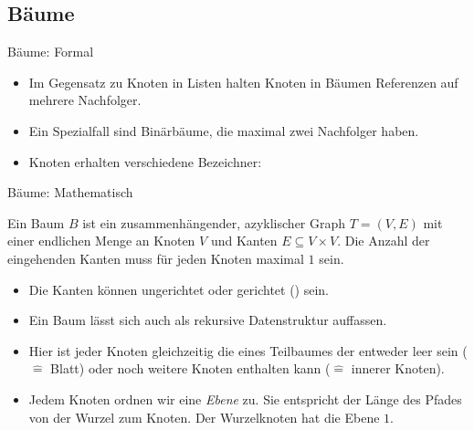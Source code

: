 \subsection{Bäume}
\begin{frame}{Bäume: Formal}
    \begin{itemize}[<+(1)->]
        \widei
        \item Im Gegensatz zu Knoten in Listen halten Knoten in Bäumen Referenzen auf mehrere Nachfolger.
        \item Ein Spezialfall sind Binärbäume, die maximal zwei Nachfolger haben.
        \item Knoten erhalten verschiedene Bezeichner: 
    \end{itemize}
\end{frame}

\begin{frame}{Bäume: Mathematisch}
    \begin{definition}[Baum]
Ein Baum \(B\) ist ein zusammenhängender, azyklischer Graph \(T = (V,E)\) mit einer endlichen Menge an Knoten \(V\) und Kanten \(E \subseteq V \times V\).\pause{} Die Anzahl der eingehenden Kanten muss für jeden Knoten maximal \(1\) sein.
    \end{definition}
    \begin{itemize}[<+(1)->]
        \item Die Kanten können ungerichtet oder gerichtet () sein.
        \item Ein Baum lässt sich auch als rekursive Datenstruktur auffassen.
        \item Hier ist jeder Knoten gleichzeitig die  eines Teilbaumes\pause{} der entweder leer sein (\(\widehat{=}\) Blatt)\pause{} oder noch weitere Knoten enthalten kann (\(\widehat{=}\) innerer Knoten).
        \item Jedem Knoten ordnen wir eine \emph{Ebene} zu. \pause{}Sie entspricht der Länge des Pfades von der Wurzel zum Knoten.\pause{} Der Wurzelknoten hat die Ebene \(1\).
    \end{itemize}
\end{frame}

